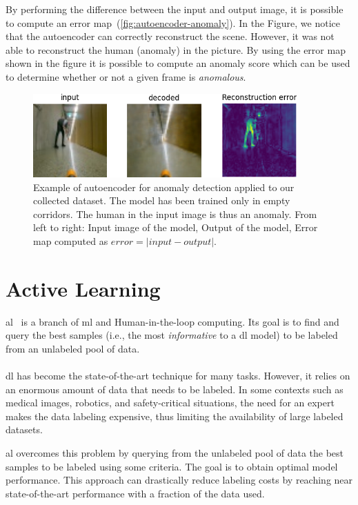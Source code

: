 By performing the difference between the input and output image, it is possible to compute an error map~(\autoref{fig:autoencoder-anomaly}). In the Figure, we notice that the autoencoder can correctly reconstruct the scene. However, it was not able to reconstruct the human (anomaly) in the picture. By using the error map shown in the figure it is possible to compute an anomaly score which can be used to determine whether or not a given frame is \emph{anomalous}.

\begin{figure}[!htbp]
    \centering
    \centerline{\includegraphics[width=0.9\textwidth]{img/anomaly_det_ex.png}}
    \caption[Autoencoer for anomaly detection]{Example of autoencoder for anomaly detection applied to our collected dataset. The model has been trained only in empty corridors. The human in the input image is thus an anomaly. From left to right: Input image of the model, Output of the model, Error map computed as $error = |input - output|$.}
    \label{fig:autoencoder-anomaly}
\end{figure}


\section{Active Learning}

     \acrfull{al}~\cite{settles.tr09} is a branch of \acrfull{ml} and Human-in-the-loop computing. Its goal is to find and query the best samples (i.e., the most \emph{informative} to a \acrfull{dl} model) to be labeled from an unlabeled pool of data.
    \\
    \\
    \acrshort{dl} has become the state-of-the-art technique for many tasks. However, it relies on an enormous amount of data that needs to be labeled. In some contexts such as medical images, robotics, and safety-critical situations, the need for an expert makes the data labeling expensive, thus limiting the availability of large labeled datasets.
    
    \acrshort{al} overcomes this problem by querying from the unlabeled pool of data the best samples to be labeled using some criteria. The goal is to obtain optimal model performance.
    This approach can drastically reduce labeling costs by reaching near state-of-the-art performance with a fraction of the data used.
    
